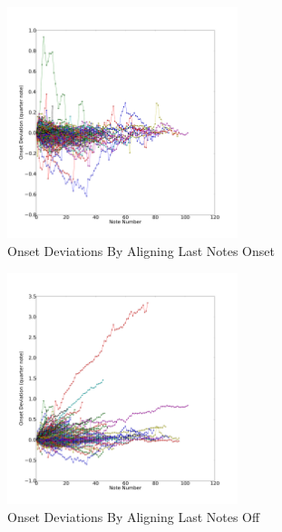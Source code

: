 \begin{figure}[tp]
   \begin{center}
      \includegraphics[width=0.6\textwidth]{fig/lian_onset_2}
   \end{center}
   \caption{Onset Deviations By Aligning Last Notes Onset}
   \label{fig:norm1}
\end{figure}


\begin{figure}[tp]
   \begin{center}
      \includegraphics[width=0.6\textwidth]{fig/lian_onset_4}
   \end{center}
   \caption{Onset Deviations By Aligning Last Notes Off}
   \label{fig:norm3}
\end{figure}

